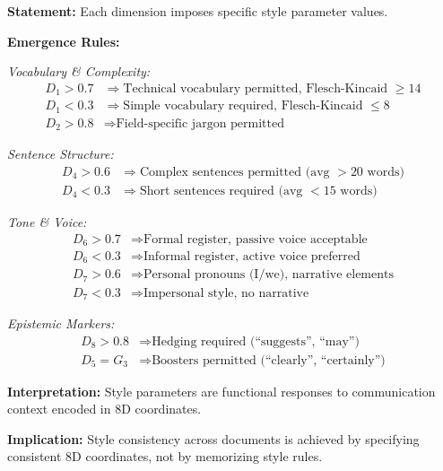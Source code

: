 \begin{tcolorbox}[colback=gray!5!white, colframe=gray!75!black,
    title=Axiom DT-8: Style Parameter Rules]
\textbf{Statement:} Each dimension imposes specific style parameter values.

\textbf{Emergence Rules:}

\textit{Vocabulary \& Complexity:}
\begin{align}
D_1 > 0.7 &\Rightarrow \text{Technical vocabulary permitted, Flesch-Kincaid } \geq 14 \\
D_1 < 0.3 &\Rightarrow \text{Simple vocabulary required, Flesch-Kincaid } \leq 8 \\
D_2 > 0.8 &\Rightarrow \text{Field-specific jargon permitted}
\end{align}

\textit{Sentence Structure:}
\begin{align}
D_4 > 0.6 &\Rightarrow \text{Complex sentences permitted (avg } > 20 \text{ words)} \\
D_4 < 0.3 &\Rightarrow \text{Short sentences required (avg } < 15 \text{ words)}
\end{align}

\textit{Tone \& Voice:}
\begin{align}
D_6 > 0.7 &\Rightarrow \text{Formal register, passive voice acceptable} \\
D_6 < 0.3 &\Rightarrow \text{Informal register, active voice preferred} \\
D_7 > 0.6 &\Rightarrow \text{Personal pronouns (I/we), narrative elements} \\
D_7 < 0.3 &\Rightarrow \text{Impersonal style, no narrative}
\end{align}

\textit{Epistemic Markers:}
\begin{align}
D_8 > 0.8 &\Rightarrow \text{Hedging required (``suggests'', ``may'')} \\
D_5 = G_3 &\Rightarrow \text{Boosters permitted (``clearly'', ``certainly'')}
\end{align}

\textbf{Interpretation:} Style parameters are functional responses to communication context
encoded in 8D coordinates.

\textbf{Implication:} Style consistency across documents is achieved by specifying
consistent 8D coordinates, not by memorizing style rules.
\end{tcolorbox}

